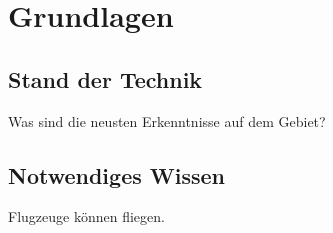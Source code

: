 \chapter{Grundlagen}
\label{chap2:grundlagen}
\section{Stand der Technik}
\label{sec:sdt}
Was sind die neusten Erkenntnisse auf dem Gebiet?

\section{Notwendiges Wissen}

Flugzeuge können fliegen.